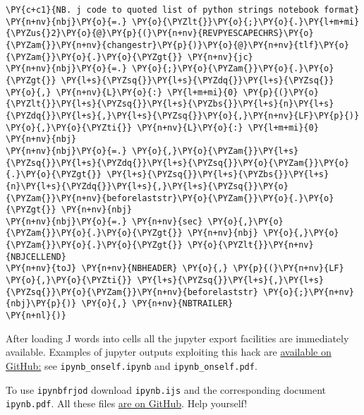 \begin{tcolorbox}[breakable, size=fbox, boxrule=1pt, pad at break*=1mm,colback=cellbackground, colframe=cellborder]
\begin{Verbatim}[commandchars=\\\{\}]
\PY{c+c1}{NB. j code to quoted list of python strings notebook format}
\PY{n+nv}{nbj}\PY{o}{=.} \PY{o}{\PYZlt{}}\PY{o}{;}\PY{o}{.}\PY{l+m+mi}{\PYZus{}2}\PY{o}{@}\PY{p}{(}\PY{n+nv}{REVPYESCAPECHRS}\PY{o}{\PYZam{}}\PY{n+nv}{changestr}\PY{p}{)}\PY{o}{@}\PY{n+nv}{tlf}\PY{o}{\PYZam{}}\PY{o}{.}\PY{o}{\PYZgt{}} \PY{n+nv}{jc}
\PY{n+nv}{nbj}\PY{o}{=.} \PY{o}{;}\PY{o}{\PYZam{}}\PY{o}{.}\PY{o}{\PYZgt{}} \PY{l+s}{\PYZsq{}}\PY{l+s}{\PYZdq{}}\PY{l+s}{\PYZsq{}} \PY{o}{,} \PY{n+nv}{L}\PY{o}{:} \PY{l+m+mi}{0} \PY{p}{(}\PY{o}{\PYZlt{}}\PY{l+s}{\PYZsq{}}\PY{l+s}{\PYZbs{}}\PY{l+s}{n}\PY{l+s}{\PYZdq{}}\PY{l+s}{,}\PY{l+s}{\PYZsq{}}\PY{o}{,}\PY{n+nv}{LF}\PY{p}{)} \PY{o}{,}\PY{o}{\PYZti{}} \PY{n+nv}{L}\PY{o}{:} \PY{l+m+mi}{0} \PY{n+nv}{nbj}
\PY{n+nv}{nbj}\PY{o}{=.} \PY{o}{,}\PY{o}{\PYZam{}}\PY{l+s}{\PYZsq{}}\PY{l+s}{\PYZdq{}}\PY{l+s}{\PYZsq{}}\PY{o}{\PYZam{}}\PY{o}{.}\PY{o}{\PYZgt{}} \PY{l+s}{\PYZsq{}}\PY{l+s}{\PYZbs{}}\PY{l+s}{n}\PY{l+s}{\PYZdq{}}\PY{l+s}{,}\PY{l+s}{\PYZsq{}}\PY{o}{\PYZam{}}\PY{n+nv}{beforelaststr}\PY{o}{\PYZam{}}\PY{o}{.}\PY{o}{\PYZgt{}} \PY{n+nv}{nbj}
\PY{n+nv}{nbj}\PY{o}{=.} \PY{n+nv}{sec} \PY{o}{,}\PY{o}{\PYZam{}}\PY{o}{.}\PY{o}{\PYZgt{}} \PY{n+nv}{nbj} \PY{o}{,}\PY{o}{\PYZam{}}\PY{o}{.}\PY{o}{\PYZgt{}} \PY{o}{\PYZlt{}}\PY{n+nv}{NBJCELLEND}
\PY{n+nv}{toJ} \PY{n+nv}{NBHEADER} \PY{o}{,} \PY{p}{(}\PY{n+nv}{LF} \PY{o}{,}\PY{o}{\PYZti{}} \PY{l+s}{\PYZsq{}}\PY{l+s}{,}\PY{l+s}{\PYZsq{}}\PY{o}{\PYZam{}}\PY{n+nv}{beforelaststr} \PY{o}{;}\PY{n+nv}{nbj}\PY{p}{)} \PY{o}{,} \PY{n+nv}{NBTRAILER}
\PY{n+nl}{)}
\end{Verbatim}
\end{tcolorbox}

After loading J words into cells all the jupyter export facilities are
immediately available. Examples of jupyter outputs exploiting this hack
are \href{https://github.com/bakerjd99/jacks/tree/master/ipynbfrjod}{available on GitHub:} see \texttt{ipynb\_onself.ipynb} and \texttt{ipynb\_onself.pdf}.

To use \texttt{ipynbfrjod} download \texttt{ipynb.ijs}
and the corresponding document \texttt{ipynb.pdf}.
All these files \href{https://github.com/bakerjd99/jacks/tree/master/ipynbfrjod}{are on
GitHub}. Help yourself!

%


%

